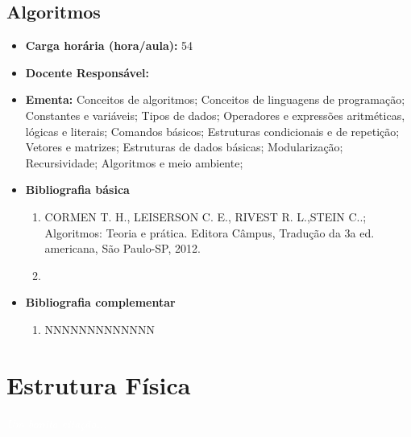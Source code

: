 \documentclass[11pt,fleqn]{book} %
\begin{document}

\newpage
\section{Algoritmos}\label{disc:algoritmos}

\begin{itemize}
	\item \textbf{Carga horária (hora/aula):} 54
	\item \textbf{Docente Responsável:}~
	\item \textbf{Ementa:} 
	Conceitos de algoritmos;
	Conceitos de linguagens de programação;
	Constantes e variáveis;
	Tipos de dados;
	Operadores e expressões aritméticas, lógicas e literais; 
	Comandos básicos;
	Estruturas condicionais e de repetição;
	Vetores e matrizes;
	Estruturas de dados básicas;
	Modularização;
	Recursividade;
	Algoritmos e meio ambiente;
	\item \textbf{Bibliografia básica}
	\begin{enumerate}
		\item CORMEN T. H., LEISERSON C. E., RIVEST R. L.,STEIN C..; Algoritmos: Teoria e prática. Editora Câmpus, Tradução da 3a ed. americana, São Paulo-SP, 2012.
		\item 
	\end{enumerate}
	\item \textbf{Bibliografia complementar}
	\begin{enumerate}
		\item NNNNNNNNNNNNN
	\end{enumerate}	
\end{itemize}



\chapter{Estrutura Física}\label{estrutura}
\vspace{6em}
\begin{flushright}
	\textit{\textcolor{white}{Um bonita citação...}}
\end{flushright}
\vspace{12em}
\end{document}
